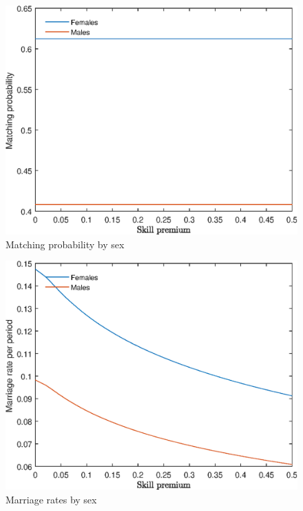 \documentclass[12pt]{article}
\begin{document}
\begin{figure}
	\centering
	\caption{Matching probability by sex}
	\includegraphics{Graphs/match_prob_skill_premium_ex1.eps}
\end{figure}

\begin{figure}
	\centering
	\caption{Marriage rates by sex}
	\includegraphics{Graphs/marr_rates_skill_premium_ex1.eps}
\end{figure}
\end{document}
